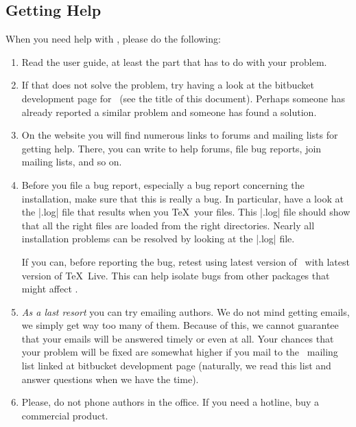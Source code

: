 \subsection{Getting Help}

When you need help with \beamer, please do the following:
\begin{enumerate}
\item
  Read the user guide, at least the part that has to do with your problem.
\item
  If that does not solve the problem, try having a look at the bitbucket development page for \beamer\ (see the title of this document). Perhaps someone has already reported a similar problem and someone has found a solution.
\item
  On the website you will find numerous links to forums and mailing lists for getting help. There, you can write to help forums, file bug reports, join mailing lists, and so on.
\item
  Before you file a bug report, especially a bug report concerning the installation, make sure that this is really a bug. In particular, have a look at the |.log| file that results when you \TeX\ your files. This |.log| file should show that all the right files are loaded from the right directories. Nearly all installation problems can be resolved by looking at the |.log| file.

  If you can, before reporting the bug, retest using latest version of \beamer\ with latest version of \TeX\ Live. This can help isolate bugs from other packages that might affect \beamer.
\item
  \emph{As a last resort} you can try emailing authors. We do not mind getting emails, we simply get way too many of them. Because of this, we cannot guarantee that your emails will be answered timely or even at all. Your chances that your problem will be fixed are somewhat higher if you mail to the \beamer\ mailing list linked at bitbucket development page (naturally, we read this list and answer questions when we have the time).
\item
  Please, do not phone authors in the office. If you need a hotline, buy a commercial product.
\end{enumerate}
